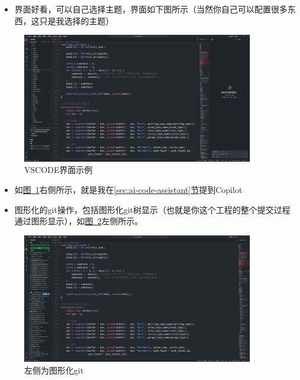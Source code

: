 \documentclass[a4paper,12pt]{article}
\begin{document}
\begin{itemize}
    \item 界面好看，可以自己选择主题，界面如下图所示（当然你自己可以配置很多东西，这只是我选择的主题）
\end{itemize}

\begin{figure}[h]
\centering
\includegraphics[width=0.9\textwidth]{images/image-20251001131744930.png}
\caption{VSCODE界面示例}
\label{fig:vscode-interface}
\end{figure}

\begin{itemize}
    \item 如\hyperref[fig:vscode-interface]{图~\ref*{fig:vscode-interface}}右侧所示，就是我在\hyperref[sec:ai-code-assistant]{\ref*{sec:ai-code-assistant}节}提到Copilot
    \item 图形化的git操作，包括图形化git树显示（也就是你这个工程的整个提交过程通过图形显示），如\hyperref[fig:git-visualization]{图~\ref*{fig:git-visualization}}左侧所示。
\end{itemize}

\begin{figure}[h]
\centering
\includegraphics[width=0.9\textwidth]{images/image-20251001132010365.png}
\caption{左侧为图形化git}
\label{fig:git-visualization}
\end{figure}
\end{document}
